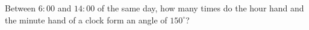 Between $6{:}00$ and $14{:}00$ of the same day, how many times do the hour hand and the minute hand of a clock form an angle of $150^\circ$?
